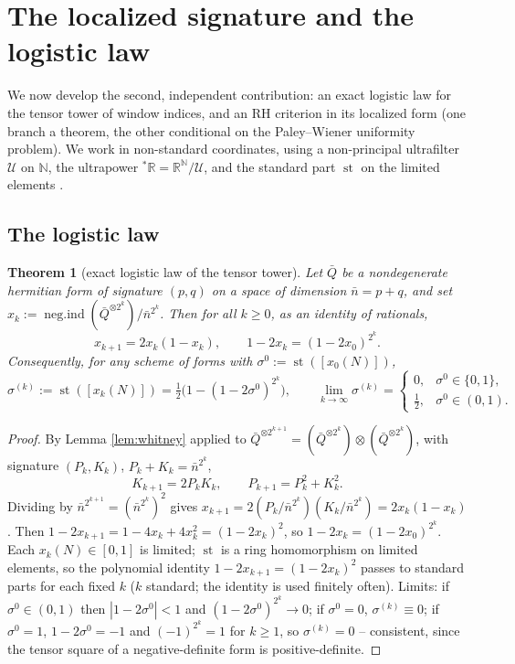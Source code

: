 \documentclass[11pt,reqno]{amsart}
\newtheorem{theorem}{Theorem}[section]
\theoremstyle{definition}
\newcommand{\negind}{\operatorname{neg.ind}}
\newcommand{\R}{\mathbb{R}}
\newcommand{\N}{\mathbb{N}}
\newcommand{\sst}{\operatorname{st}}
\begin{document}
\section{The localized signature and the logistic law}\label{sec:logistic}

We now develop the second, independent contribution: an exact logistic law for
the tensor tower of window indices, and an RH criterion in its localized
form (one branch a theorem, the other conditional on the Paley--Wiener uniformity problem). We work in
non-standard coordinates, using a non-principal ultrafilter
\(\mathcal U\) on \(\N\), the ultrapower \({}^*\R=\R^\N/\mathcal U\), and the
standard part \(\sst\) on the limited elements \cite{Robinson}.

\subsection{The logistic law}

\begin{theorem}[exact logistic law of the tensor tower]\label{thm:logistic}
Let \(\bar Q\) be a nondegenerate hermitian form of signature \((p,q)\) on a
space of dimension \(\bar n=p+q\), and set
\(x_k:=\negind(\bar Q^{\otimes 2^k})/\bar n^{2^k}\). Then for all \(k\geq0\), as
an identity of rationals,
\[
x_{k+1}=2x_k(1-x_k),\qquad 1-2x_k=(1-2x_0)^{2^k}.
\]
Consequently, for any scheme of forms with \(\sigma^0:=\sst([x_0(N)])\),
\[
\sigma^{(k)}:=\sst([x_k(N)])=\tfrac12\bigl(1-(1-2\sigma^0)^{2^k}\bigr),
\qquad
\lim_{k\to\infty}\sigma^{(k)}=
\begin{cases}0,&\sigma^0\in\{0,1\},\\[2pt]\tfrac12,&\sigma^0\in(0,1).\end{cases}
\]
\end{theorem}

\begin{proof}
By Lemma \ref{lem:whitney} applied to
\(\bar Q^{\otimes 2^{k+1}}=(\bar Q^{\otimes 2^k})\otimes(\bar Q^{\otimes 2^k})\),
with signature \((P_k,K_k)\), \(P_k+K_k=\bar n^{2^k}\),
\[
K_{k+1}=2P_kK_k,\qquad P_{k+1}=P_k^2+K_k^2.
\]
Dividing by \(\bar n^{2^{k+1}}=(\bar n^{2^k})^2\) gives
\(x_{k+1}=2(P_k/\bar n^{2^k})(K_k/\bar n^{2^k})=2x_k(1-x_k)\). Then
\(1-2x_{k+1}=1-4x_k+4x_k^2=(1-2x_k)^2\), so \(1-2x_k=(1-2x_0)^{2^k}\). Each
\(x_k(N)\in[0,1]\) is limited; \(\sst\) is a ring homomorphism on limited
elements, so the polynomial identity \(1-2x_{k+1}=(1-2x_k)^2\) passes to
standard parts for each fixed \(k\) (\(k\) standard; the identity is used
finitely often). Limits: if \(\sigma^0\in(0,1)\) then \(|1-2\sigma^0|<1\) and
\((1-2\sigma^0)^{2^k}\to0\); if \(\sigma^0=0\), \(\sigma^{(k)}\equiv0\); if
\(\sigma^0=1\), \(1-2\sigma^0=-1\) and \((-1)^{2^k}=1\) for \(k\geq1\), so
\(\sigma^{(k)}=0\) -- consistent, since the tensor square of a negative-definite
form is positive-definite.
\end{proof}
\end{document}
